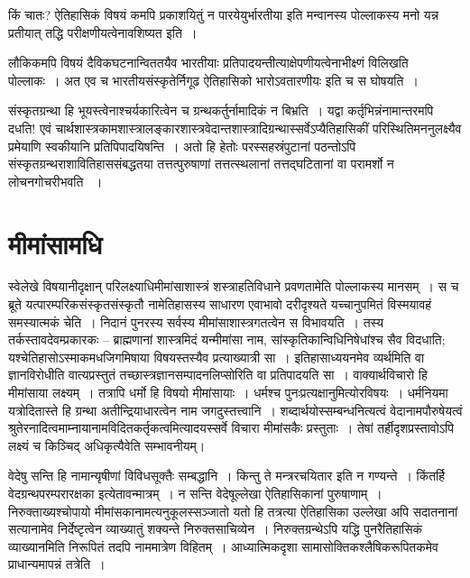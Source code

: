 किं चातः? ऐतिहासिकं विषयं कमपि प्रकाशयितुं न पारयेयुर्भारतीया इति मन्वानस्य पोल्लाकस्य
 मनो यन्न प्रतीयात् तद्धि परीक्षणीयत्वेनावशिष्यत इति~।

लौकिकमपि विषयं दैविकघटनान्विततयैव भारतीयाः प्रतिपादयन्तीत्याक्षेपणीयत्वेनाभीक्ष्णं विलिखति पोल्लाकः~। अत एव च भारतीयसंस्कृतेर्निगूढ ऐतिहासिको भारोऽवतारणीयः इति च स घोषयति~।

संस्कृतग्रन्था हि भूयस्त्वेनाश्चर्यकारित्वेन च ग्रन्थकर्तुर्नामादिकं न बिभ्रति~। यद्वा कर्तृभिन्नं\break नामान्तरमपि दधति! एवं चार्थशास्त्रकामशास्त्रालङ्कारशास्त्रवेदान्तशास्त्रादिग्रन्थास्सर्वेऽप्यैतिहासिकीं परिस्थितिमननुलक्ष्यैव प्रमेयाणि स्वकीयानि प्रतिपिपादयिषन्ति~। अतो हि हेतोः परस्सहस्रं\break पुटानां पठन्तोऽपि संस्कृतग्रन्थराशावितिहाससंबद्धतया तत्तत्पुरुषाणां तत्तत्स्थलानां तत्तद्घटितानां वा परामर्शो न लोचनगोचरीभवति ~।


\section*{मीमांसामधि}

स्वेलेखे विषयानीदृक्षान् परिलक्ष्याधिमीमांसाशास्त्रं शस्त्राहतिविधाने प्रवणतामेति पोल्लाकस्य मानसम्~। स च ब्रूते यत्पारम्परिकसंस्कृतसंस्कृतौ नामेतिहासस्य साधारण एवाभावो दरीदृश्यते यच्चानुपमितं विस्मयावहं समस्यात्मकं चेति~। निदानं पुनरस्य सर्वस्य मीमांसाशास्त्रगतत्वेन स विभावयति~। तस्य तर्कस्तावदेवम्प्रकारकः – ब्राह्मणानां शास्त्रमिदं यन्मीमांसा नाम, सांस्कृतिकान्विधिनिषेधांश्च सैव विदधाति; यश्चेतिहासोऽस्माकमधजिगमिषाया विषयस्तस्यैव प्रत्याख्यात्री सा~। इतिहासाध्ययनमेव व्यर्थमिति वा ज्ञानविरोधीति वात्यप्रस्तुतं तच्छास्त्रज्ञानसम्पादनलिप्सोरिति वा प्रतिपादयति सा~। वाक्यार्थविचारो हि मीमांसाया लक्ष्यम्~। तत्रापि धर्मो हि विषयो मीमांसायाः~। धर्मश्च पुनःप्रत्यक्षानुमित्योरविषयः~। धर्मनियमा यत्रोदितास्ते हि ग्रन्था अतीन्द्रियाधारत्वेन नाम जगदुस्तत्त्वानि~। शब्दार्थयोस्सम्बन्धनित्यत्वं वेदानामपौरुषेयत्वं श्रुतेरनादित्वमाम्नायानामविदितकर्तृकत्वमित्यादयस्सर्वे विचारा मीमांसकैः प्रस्तुताः~। तेषां तर्हीदृशप्रस्तावोऽपि लक्ष्यं च किञ्चिद् अधिकृत्यैवेति सम्भावनीयम्।

वेदेषु सन्ति हि नामान्यृषीणां विविधसूक्तैः सम्बद्धानि~। किन्तु ते मन्त्ररचयितार इति न गण्यन्ते~। किंतर्हि वेदग्रन्थपरम्परारक्षका इत्येतावन्मात्रम्~। न सन्ति वेदेषूल्लेखा ऐतिहासिकानां पुरुषाणाम्~। निरुक्ताख्यश्चोपायो मीमांसकानामत्यनुकूलस्सञ्जातो यतो हि तत्रत्या ऐतिहासिका उल्लेखा अपि सदातनानां सत्यानामेव निर्देष्टृत्वेन व्याख्यातुं शक्यन्ते निरुक्तसाचिव्येन~।
 निरुक्तग्रन्थेऽपि यद्धि पुनरैतिहासिकं व्याख्यानमिति निरूपितं तदपि नाममात्रेण विहितम्~। आध्यात्मिकदृशा सामासोक्तिकश्लैषिकरूपितकमेव प्राधान्यमापन्नं तत्रेति~।

